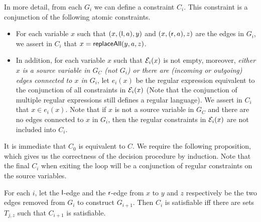 In more detail, from each $G_i$ we can define a constraint $C_i$. This constraint is a conjunction of the following atomic constraints.
\begin{itemize}
\item For each variable $x$ such that $(x, (\mathsf{l}, a), y)$ and $(x, (\mathsf{r},a), z)$ are the edges in $G_i$, we assert in $C_i$ that $x = \mathsf{replaceAll}(y, a, z)$.
\item In addition, for each variable $x$ such that $\mathcal{E}_i(x)$ is not empty, moreover, \emph{either $x$ is a source variable in $G_C$ (not $G_i$) or there are (incoming or outgoing) edges connected to $x$ in $G_i$}, let $e_i(x)$ be the regular expression equivalent to the conjunction of all constraints in $\mathcal{E}_i(x)$ (Note that the conjunction of multiple regular expressions still defines a regular language). We assert in $C_i$ that $x \in e_i(x)$. Note that if $x$ is not a source variable in $G_C$ and there are no edges connected to $x$ in $G_i$, then the regular constraints in $\mathcal{E}_i(x)$ are not included into $C_i$.
\end{itemize}


It is immediate that $C_0$ is equivalent to $C$.
We require the following proposition, which gives us the correctness of the decision procedure by induction.
Note that the final $C_i$ when exiting the loop will be a conjunction of regular constraints on the source variables.

\begin{proposition}
    For each $i$,  let the $\mathsf{l}$-edge and the $\mathsf{r}$-edge from $x$ to $y$ and $z$ respectively be the two edges removed from $G_i$ to construct $G_{i+1}$. Then $C_i$ is satisfiable iff there are sets $T_{j, z}$ such that $C_{i+1}$ is satisfiable.
\end{proposition}

